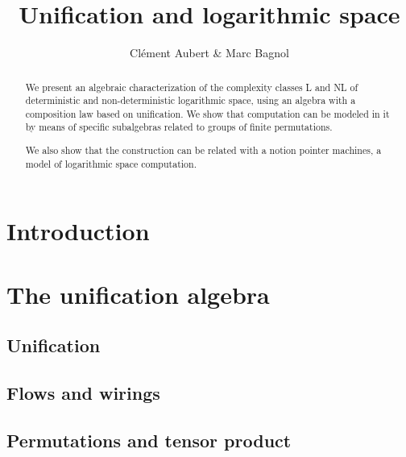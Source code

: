 

\title{Unification and logarithmic space}
\author{Clément Aubert \& Marc Bagnol}

\maketitle







\begin{abstract}
	We present an algebraic characterization of the complexity classes L and NL of deterministic and non-deterministic logarithmic space, using an algebra with a composition law based on unification. We show that computation can be modeled in it by means of specific subalgebras related to groups of finite permutations.

We also show that the construction can be related with a notion pointer machines, a model of logarithmic space computation.
\end{abstract}


\section*{Introduction}


\section{The unification algebra}\label{sec:unification}
	\subsection{Unification}
	
	\subsection{Flows and wirings}
	
	\subsection{Permutations and tensor product}\label{permutation}
	

